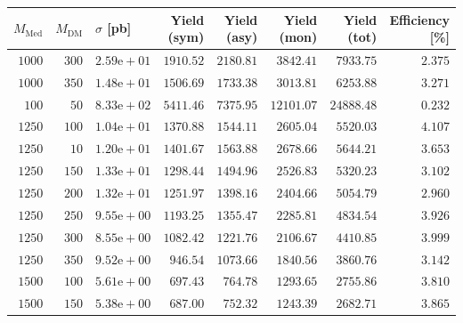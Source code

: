 \begin{table}
    \centering
    {\small
    \begin{tabular}{rrlrrrrr}
    \hline\hline
    $M_{\text{Med}}$ & $M_{\text{DM}}$ & $\sigma$ [pb] & Yield (sym) & Yield (asy) & Yield (mon) & Yield (tot) & Efficiency [\%] \\
    \hline
    $1000$ & $300$ & $2.59\text{e}+01$ & $1910.52$ & $2180.81$ & $3842.41$ & $7933.75$ & $2.375$ \\
    $1000$ & $350$ & $1.48\text{e}+01$ & $1506.69$ & $1733.38$ & $3013.81$ & $6253.88$ & $3.271$ \\
    $100$ & $50$ & $8.33\text{e}+02$ & $5411.46$ & $7375.95$ & $12101.07$ & $24888.48$ & $0.232$ \\
    $1250$ & $100$ & $1.04\text{e}+01$ & $1370.88$ & $1544.11$ & $2605.04$ & $5520.03$ & $4.107$ \\
    $1250$ & $10$ & $1.20\text{e}+01$ & $1401.67$ & $1563.88$ & $2678.66$ & $5644.21$ & $3.653$ \\
    $1250$ & $150$ & $1.33\text{e}+01$ & $1298.44$ & $1494.96$ & $2526.83$ & $5320.23$ & $3.102$ \\
    $1250$ & $200$ & $1.32\text{e}+01$ & $1251.97$ & $1398.16$ & $2404.66$ & $5054.79$ & $2.960$ \\
    $1250$ & $250$ & $9.55\text{e}+00$ & $1193.25$ & $1355.47$ & $2285.81$ & $4834.54$ & $3.926$ \\
    $1250$ & $300$ & $8.55\text{e}+00$ & $1082.42$ & $1221.76$ & $2106.67$ & $4410.85$ & $3.999$ \\
    $1250$ & $350$ & $9.52\text{e}+00$ & $946.54$ & $1073.66$ & $1840.56$ & $3860.76$ & $3.142$ \\
    $1500$ & $100$ & $5.61\text{e}+00$ & $697.43$ & $764.78$ & $1293.65$ & $2755.86$ & $3.810$ \\
    $1500$ & $150$ & $5.38\text{e}+00$ & $687.00$ & $752.32$ & $1243.39$ & $2682.71$ & $3.865$ \\

\end{tabular}}
\end{table}
